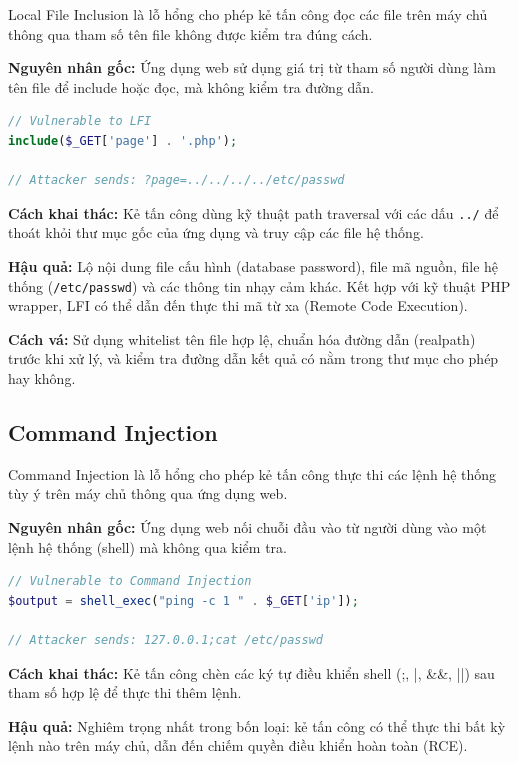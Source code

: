 \documentclass[12pt,a4paper,twoside]{report}
\begin{document}
Local File Inclusion là lỗ hổng cho phép kẻ tấn công đọc các file trên máy chủ thông qua tham số tên file không được kiểm tra đúng cách.

\textbf{Nguyên nhân gốc:} Ứng dụng web sử dụng giá trị từ tham số người dùng làm tên file để include hoặc đọc, mà không kiểm tra đường dẫn.

\begin{lstlisting}[language=PHP,caption=LFI -- vulnerable code]
// Vulnerable to LFI
include($_GET['page'] . '.php');

// Attacker sends: ?page=../../../../etc/passwd
\end{lstlisting}

\textbf{Cách khai thác:} Kẻ tấn công dùng kỹ thuật path traversal với các dấu \texttt{../} để thoát khỏi thư mục gốc của ứng dụng và truy cập các file hệ thống.

\textbf{Hậu quả:} Lộ nội dung file cấu hình (database password), file mã nguồn, file hệ thống (\texttt{/etc/passwd}) và các thông tin nhạy cảm khác. Kết hợp với kỹ thuật PHP wrapper, LFI có thể dẫn đến thực thi mã từ xa (Remote Code Execution).

\textbf{Cách vá:} Sử dụng whitelist tên file hợp lệ, chuẩn hóa đường dẫn (realpath) trước khi xử lý, và kiểm tra đường dẫn kết quả có nằm trong thư mục cho phép hay không.

\subsection{Command Injection}

Command Injection là lỗ hổng cho phép kẻ tấn công thực thi các lệnh hệ thống tùy ý trên máy chủ thông qua ứng dụng web.

\textbf{Nguyên nhân gốc:} Ứng dụng web nối chuỗi đầu vào từ người dùng vào một lệnh hệ thống (shell) mà không qua kiểm tra.

\begin{lstlisting}[language=PHP,caption=Command Injection -- vulnerable code]
// Vulnerable to Command Injection
$output = shell_exec("ping -c 1 " . $_GET['ip']);

// Attacker sends: 127.0.0.1;cat /etc/passwd
\end{lstlisting}

\textbf{Cách khai thác:} Kẻ tấn công chèn các ký tự điều khiển shell (;, |, \&\&, ||) sau tham số hợp lệ để thực thi thêm lệnh.

\textbf{Hậu quả:} Nghiêm trọng nhất trong bốn loại: kẻ tấn công có thể thực thi bất kỳ lệnh nào trên máy chủ, dẫn đến chiếm quyền điều khiển hoàn toàn (RCE).
\end{document}
